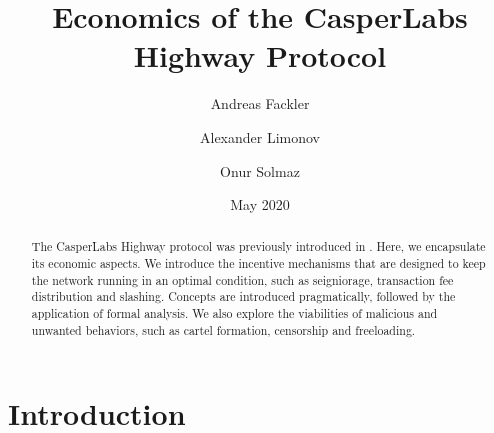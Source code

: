 \documentclass[12pt]{article}
\title{Economics of the CasperLabs Highway Protocol}
\author{Andreas Fackler}
\author{Alexander Limonov}
\author{Onur Solmaz}
\affil{CasperLabs}
\date{May 2020}
\begin{document}
\maketitle

\begin{abstract}
  The CasperLabs Highway protocol was previously introduced in \cite{kane2019casperlabs}. Here, we encapsulate its economic aspects. We introduce the incentive mechanisms that are designed to keep the network running in an optimal condition, such as seigniorage, transaction fee distribution and slashing. Concepts are introduced pragmatically, followed by the application of formal analysis. We also explore the viabilities of malicious and unwanted behaviors, such as cartel formation, censorship and freeloading.
\end{abstract}

\tableofcontents
\pagebreak

\section*{Introduction}



\newpage

\printbibliography
\end{document}
